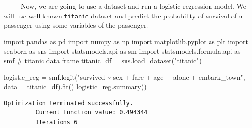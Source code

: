 \documentclass[
  letterpaper,
  DIV=11,
  numbers=noendperiod]{scrreprt}
\newenvironment{Shaded}{\begin{snugshade}}{\end{snugshade}}
\newcommand{\CommentTok}[1]{\textcolor[rgb]{0.37,0.37,0.37}{#1}}
\newcommand{\ImportTok}[1]{\textcolor[rgb]{0.00,0.46,0.62}{#1}}
\newcommand{\NormalTok}[1]{\textcolor[rgb]{0.00,0.23,0.31}{#1}}
\newcommand{\OperatorTok}[1]{\textcolor[rgb]{0.37,0.37,0.37}{#1}}
\newcommand{\StringTok}[1]{\textcolor[rgb]{0.13,0.47,0.30}{#1}}
\begin{document}

~~~~~Now, we are going to use a dataset and run a logistic regression
model. We will use well known \texttt{titanic} dataset and predict the
probability of survival of a passenger using some variables of the
passenger.

\begin{Shaded}
\begin{Highlighting}[]
\ImportTok{import}\NormalTok{ pandas }\ImportTok{as}\NormalTok{ pd}
\ImportTok{import}\NormalTok{ numpy }\ImportTok{as}\NormalTok{ np}
\ImportTok{import}\NormalTok{ matplotlib.pyplot }\ImportTok{as}\NormalTok{ plt }
\ImportTok{import}\NormalTok{ seaborn }\ImportTok{as}\NormalTok{ sns}
\ImportTok{import}\NormalTok{ statsmodels.api }\ImportTok{as}\NormalTok{ sm}
\ImportTok{import}\NormalTok{ statsmodels.formula.api }\ImportTok{as}\NormalTok{ smf }
\CommentTok{\# titanic data frame }
\NormalTok{titanic\_df }\OperatorTok{=}\NormalTok{ sns.load\_dataset(}\StringTok{"titanic"}\NormalTok{)}
\end{Highlighting}
\end{Shaded}

\begin{Shaded}
\begin{Highlighting}[]
\NormalTok{logistic\_reg }\OperatorTok{=}\NormalTok{ smf.logit(}\StringTok{"survived \textasciitilde{} sex + fare + age + alone + embark\_town"}\NormalTok{, data }\OperatorTok{=}\NormalTok{ titanic\_df).fit()}
\NormalTok{logistic\_reg.summary()}
\end{Highlighting}
\end{Shaded}

\begin{verbatim}
Optimization terminated successfully.
         Current function value: 0.494344
         Iterations 6
\end{verbatim}
\end{document}
